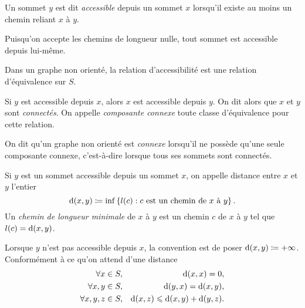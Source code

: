 \documentclass{magnolia}
\begin{document}
\begin{definition}
Un sommet $y$ est dit \emph{accessible}
depuis un sommet $x$ lorsqu'il existe au moins un chemin
reliant $x$ à $y$.
\end{definition}

\begin{remarqueUnique}
\remarque Puisqu'on accepte les chemins de longueur nulle, tout sommet est
  accessible depuis lui-même.
\end{remarqueUnique}

\begin{proposition}
Dans un graphe non orienté, la relation d'accessibilité est une relation d'équivalence
sur $S$. 
\end{proposition}

\begin{remarques}
\remarque Si $y$ est accessible depuis $x$, alors $x$ est
  accessible depuis $y$. On dit alors que $x$ et $y$ sont \emph{connectés}.
\remarque On appelle \emph{composante connexe} toute classe d'équivalence
pour cette relation.
\end{remarques}

\begin{definition}
On dit qu'un graphe non orienté est \emph{connexe} lorsqu'il ne possède qu'une seule
composante connexe, c'est-à-dire lorsque tous ses sommets sont connectés.
\end{definition}

\begin{definition}
Si $y$ est un sommet accessible depuis un sommet $x$, on appelle distance entre $x$ et
$y$ l'entier
\[{\rm d}(x, y) \defeq \inf \ensim{l(c)}{c
      \textnormal{ est un chemin de } x \textnormal{ à } y}.\]
Un \emph{chemin de longueur minimale} de $x$ à $y$ est un chemin $c$
de $x$ à $y$ tel que $l(c) = {\rm d}(x, y)$.
\end{definition}

\begin{remarques}
\remarque Lorsque $y$ n'est pas accessible depuis $x$, la convention est de poser
  ${\rm d}(x, y)\defeq +\infty$.
\remarque Conformément à ce qu'on attend d'une distance
  \begin{eqnarray*}
  \forall x\in S,& & {\rm d}(x, x)=0,\\
  \forall x,y\in S,& & {\rm d}(y, x)={\rm d}(x, y),\\
  \forall x,y,z\in S,& & {\rm d}(x, z)\leq {\rm d}(x, y)+{\rm d}(y, z).\\
  \end{eqnarray*}
\end{remarques}
\end{document}

